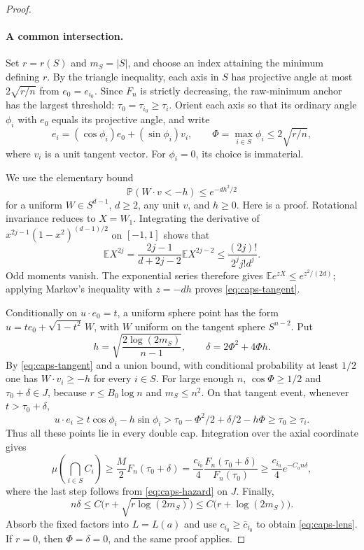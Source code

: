 \begin{proof}
\paragraph{A common intersection.}
Set \(r=r(S)\) and \(m_S=|S|\), and choose an index attaining the
minimum defining \(r\). By the triangle inequality, each axis in
\(S\) has projective angle at most \(2\sqrt{r/n}\) from
\(e_0=e_{i_0}\). Since \(F_n\) is strictly decreasing, the
raw-minimum anchor has the largest threshold:
\(\tau_0=\tau_{i_0}\ge\tau_i\).
Orient each axis so that its ordinary angle \(\phi_i\) with
\(e_0\) equals its projective angle, and write
\[
 e_i=(\cos\phi_i)e_0+(\sin\phi_i)v_i,\qquad
 \Phi=\max_{i\in S}\phi_i\le2\sqrt{r/n},
\]
where \(v_i\) is a unit tangent vector. For \(\phi_i=0\), its
choice is immaterial.

We use the elementary bound
\begin{equation}
 \mathbb{P}(W\cdot v<-h)\le e^{-dh^2/2}
 \label{eq:caps-tangent}
\end{equation}
for a uniform \(W\in S^{d-1}\), \(d\ge2\), any unit \(v\), and
\(h\ge0\). Here is a proof. Rotational invariance reduces to
\(X=W_1\). Integrating the derivative of
\(x^{2j-1}(1-x^2)^{(d-1)/2}\) on \([-1,1]\) shows that
\[
 \mathbb{E} X^{2j}
 =\frac{2j-1}{d+2j-2}\mathbb{E} X^{2j-2}
 \le\frac{(2j)!}{2^j j!d^j}.
\]
Odd moments vanish. The exponential series therefore gives
\(\mathbb{E} e^{zX}\le e^{z^2/(2d)}\); applying Markov's inequality
with \(z=-dh\) proves \eqref{eq:caps-tangent}.

Conditionally on \(u\cdot e_0=t\), a uniform sphere point has the
form \(u=te_0+\sqrt{1-t^2}\,W\), with \(W\) uniform on the tangent
sphere \(S^{n-2}\). Put
\[
 h=\sqrt{\frac{2\log(2m_S)}{n-1}},\qquad
 \delta=2\Phi^2+4\Phi h.
\]
By \eqref{eq:caps-tangent} and a union bound, with conditional
probability at least \(1/2\) one has \(W\cdot v_i\ge-h\) for
every \(i\in S\). For large enough \(n\),
\(\cos\Phi\ge1/2\) and \(\tau_0+\delta\in J\), because
\(r\le B_0\log n\) and \(m_S\le n^2\). On that tangent event,
whenever \(t>\tau_0+\delta\),
\[
 u\cdot e_i
 \ge t\cos\phi_i-h\sin\phi_i
 >\tau_0-\Phi^2/2+\delta/2-h\Phi
 \ge\tau_0\ge\tau_i.
\]
Thus all these points lie in every double cap. Integration over the
axial coordinate gives
\[
 \mu\left(\bigcap_{i\in S}C_i\right)
 \ge\frac M2F_n(\tau_0+\delta)
 =\frac{c_{i_0}}4\frac{F_n(\tau_0+\delta)}{F_n(\tau_0)}
 \ge\frac{c_{i_0}}4 e^{-C_an\delta},
\]
where the last step follows from \eqref{eq:caps-hazard} on \(J\).
Finally,
\[
 n\delta\le C\bigl(r+\sqrt{r\log(2m_S)}\bigr)
 \le C\bigl(r+\log(2m_S)\bigr).
\]
Absorb the fixed factors into \(L=L(a)\) and use
\(c_{i_0}\ge\bar c_{i_0}\) to obtain \eqref{eq:caps-lens}.
If \(r=0\), then \(\Phi=\delta=0\), and the same proof applies.
\end{proof}

